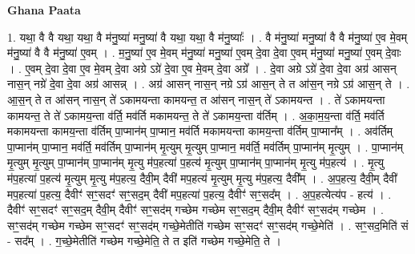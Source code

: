 \documentclass[17pt]{extarticle}
\begin{document}
\textbf{Ghana Paata } \newline

1. यथा॒ वै वै यथा॒ यथा॒ वै म॑नु॒ष्या॑ मनु॒ष्या॑ वै यथा॒ यथा॒ वै म॑नु॒ष्याः᳚ । . वै म॑नु॒ष्या॑ मनु॒ष्या॑ वै वै म॑नु॒ष्या॑ ए॒व मे॒वम् म॑नु॒ष्या॑ वै वै म॑नु॒ष्या॑ ए॒वम् । . म॒नु॒ष्या॑ ए॒व मे॒वम् म॑नु॒ष्या॑ मनु॒ष्या॑ ए॒वम् दे॒वा दे॒वा ए॒वम् म॑नु॒ष्या॑ मनु॒ष्या॑ ए॒वम् दे॒वाः । . ए॒वम् दे॒वा दे॒वा ए॒व मे॒वम् दे॒वा अग्रे ऽग्रे॑ दे॒वा ए॒व मे॒वम् दे॒वा अग्रे᳚ । . दे॒वा अग्रे ऽग्रे॑ दे॒वा दे॒वा अग्र॑ आसन् नास॒न् नग्रे॑ दे॒वा दे॒वा अग्र॑ आसन्न् । . अग्र॑ आसन् नास॒न् नग्रे ऽग्र॑ आस॒न् ते त आ॑स॒न् नग्रे ऽग्र॑ आस॒न् ते । . आ॒स॒न् ते त आ॑सन् नास॒न् ते॑ ऽकामयन्ता कामयन्त॒ त आ॑सन् नास॒न् ते॑ ऽकामयन्त । . ते॑ ऽकामयन्ता कामयन्त॒ ते ते॑ ऽकामय॒न्ता व॑र्ति॒ मव॑र्ति मकामयन्त॒ ते ते॑ ऽकामय॒न्ता व॑र्तिम् । . अ॒का॒म॒य॒न्ता व॑र्ति॒ मव॑र्ति मकामयन्ता कामय॒न्ता व॑र्तिम् पा॒प्मान॑म् पा॒प्मान॒ मव॑र्ति मकामयन्ता कामय॒न्ता व॑र्तिम् पा॒प्मान᳚म् । . अव॑र्तिम् पा॒प्मान॑म् पा॒प्मान॒ मव॑र्ति॒ मव॑र्तिम् पा॒प्मान॑म् मृ॒त्युम् मृ॒त्युम् पा॒प्मान॒ मव॑र्ति॒ मव॑र्तिम् पा॒प्मान॑म् मृ॒त्युम् । . पा॒प्मान॑म् मृ॒त्युम् मृ॒त्युम् पा॒प्मान॑म् पा॒प्मान॑म् मृ॒त्यु म॑प॒हत्या॑ प॒हत्य॑ मृ॒त्युम् पा॒प्मान॑म् पा॒प्मान॑म् मृ॒त्यु म॑प॒हत्य॑ । . मृ॒त्यु म॑प॒हत्या॑ प॒हत्य॑ मृ॒त्युम् मृ॒त्यु म॑प॒हत्य॒ दैवी॒म् दैवी॑ मप॒हत्य॑ मृ॒त्युम् मृ॒त्यु म॑प॒हत्य॒ दैवी᳚म् । . अ॒प॒हत्य॒ दैवी॒म् दैवी॑ मप॒हत्या॑ प॒हत्य॒ दैवीꣳ॑ सꣳ॒॒सदꣳ॑ सꣳ॒॒सद॒म् दैवी॑ मप॒हत्या॑ प॒हत्य॒ दैवीꣳ॑ सꣳ॒॒सद᳚म् । . अ॒प॒हत्येत्य॑प - हत्य॑ । . दैवीꣳ॑ सꣳ॒॒सदꣳ॑ सꣳ॒॒सद॒म् दैवी॒म् दैवीꣳ॑ सꣳ॒॒सद॑म् गच्छेम गच्छेम सꣳ॒॒सद॒म् दैवी॒म् दैवीꣳ॑ सꣳ॒॒सद॑म् गच्छेम । . सꣳ॒॒सद॑म् गच्छेम गच्छेम सꣳ॒॒सदꣳ॑ सꣳ॒॒सद॑म् गच्छे॒मेतीति॑ गच्छेम सꣳ॒॒सदꣳ॑ सꣳ॒॒सद॑म् गच्छे॒मेति॑ । . सꣳ॒॒सद॒मिति॑ सं - सद᳚म् । . ग॒च्छे॒मेतीति॑ गच्छेम गच्छे॒मेति॒ ते त इति॑ गच्छेम गच्छे॒मेति॒ ते । \newline
\end{document}
